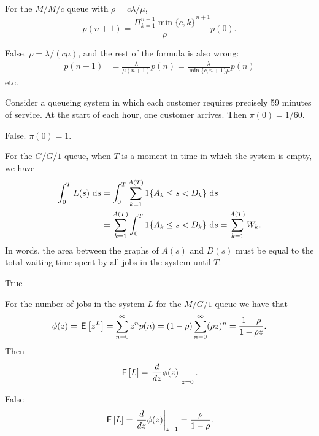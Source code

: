 \begin{exercise}[201704]%
For the $M/M/c$ queue with $\rho= c \lambda/\mu$, 
    \begin{equation*}
       p(n+1) = \frac{\Pi_{k=1}^{n+1}\min\{c, k\}}\rho^{n+1} p(0).
    \end{equation*}
\begin{solution} False. $\rho= \lambda/ (c\mu)$, and the rest of the formula is also wrong:
    \begin{align*}
        p(n+1) 
&= \frac{\lambda}{\mu(n+1)}p(n) 
= \frac{\lambda}{\min\{c, n+1\} \mu }p(n)
    \end{align*}
etc.
\end{solution}
\end{exercise}

\begin{exercise}[201704]%
  Consider a queueing system in which each customer requires precisely
  59 minutes of service. At the start of each hour, one customer arrives. Then
  $\pi(0) = 1/60$.
\begin{solution} False. $\pi(0)=1$.
\end{solution}
\end{exercise}

\begin{exercise}[201704]%
For  the $G/G/1$ queue, when $T$ is a moment in time in which the system is empty, we have
\begin{equation*}
  \begin{split}
  \int_0^T L(s)\, \,\text{d}s & = \int_0^T \sum_{k=1}^{A(T)} 1\{A_k \leq s < D_k\} \, \,\text{d}s \\
& =  \sum_{k=1}^{A(T)}\int_0^T  1\{A_k \leq s < D_k\} \, \,\text{d}s =  \sum_{k=1}^{A(T)} W_k.
  \end{split}
\end{equation*}
In words, the area between the graphs of $A(s)$ and $D(s)$ must
be equal to the total waiting time spent by all jobs in the system
until $T$. 
\begin{solution} True
\end{solution}
\end{exercise}

\begin{exercise}[201704]%
  For the number of jobs in the system $L$ for the $M/G/1$ queue we have that
\begin{equation*}
  \phi(z) = \,\mathsf{E}\left[z^L\right] = \sum_{n=0}^\infty z^n p(n) = (1-\rho) \sum_{n=0}^\infty (\rho z)^n = \frac{1-\rho}{1-\rho z}.
\end{equation*}
Then 
\begin{equation*}
  \,\mathsf{E}\left[L\right] = \left.\frac d {dz} \phi(z)\right|_{z=0}.
\end{equation*}

\begin{solution} False
\begin{equation*}
  \,\mathsf{E}\left[L\right] = \left.\frac d {dz} \phi(z)\right|_{z=1} = \frac{\rho}{1-\rho}.
\end{equation*}
\end{solution}
\end{exercise}


